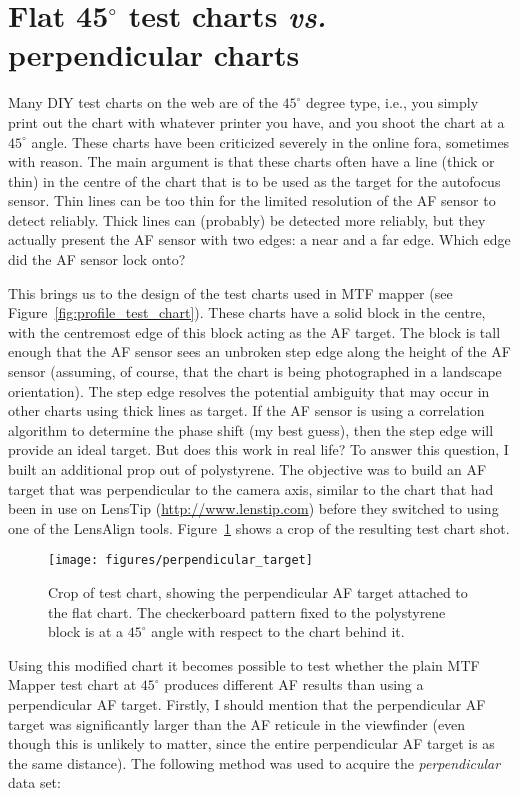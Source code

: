 \documentclass[a4paper]{article}
\begin{document}
\section{Flat 45$^\circ$ test charts \emph{vs.} perpendicular charts}
\label{sec:perpendicular}
Many DIY test charts on the web are of the $45^\circ$ degree type, i.e., you
simply print out the chart with whatever printer you have, and you shoot the
chart at a $45^\circ$ angle. These charts have been criticized severely in
the online fora, sometimes with reason. The main argument is that these
charts often have a line (thick or thin) in the centre of the chart that is
to be used as the target for the autofocus sensor. Thin lines can be too
thin for the limited resolution of the AF sensor to detect reliably. Thick
lines can (probably) be detected more reliably, but they actually present
the AF sensor with two edges: a near and a far edge. Which edge did the AF
sensor lock onto?

This brings us to the design of the test charts used in MTF mapper (see
Figure~\ref{fig:profile_test_chart}). These charts have a solid block in the
centre, with the centremost edge of this block acting as the AF target. The block is
tall enough that the AF sensor sees an unbroken step edge along the height
of the AF sensor (assuming, of course, that the chart is being photographed in a
landscape orientation). The step edge resolves the potential ambiguity that
may occur in other charts using thick lines as target. If the AF sensor is
using a correlation algorithm to determine the phase shift (my best
guess), then the step edge will provide an ideal target. But does this work
in real life? To answer this question, I built an additional prop out of
polystyrene. The objective was to build an AF target that was perpendicular
to the camera axis, similar to the chart that had been in use on LensTip
(\url{http://www.lenstip.com}) before they switched to using one of the
LensAlign tools. Figure~\ref{fig:perpendicular_target} shows a crop of the
resulting test chart shot.

\begin{figure}
  \centering
  \texttt{[image: figures/perpendicular\_target]}
  \caption{Crop of test chart, showing the perpendicular AF target attached
to the flat chart. The checkerboard pattern fixed to the polystyrene block
is at a $45^\circ$ angle with respect to the chart behind it.}
  \label{fig:perpendicular_target}
\end{figure}

Using this modified chart it becomes possible to test whether the plain MTF
Mapper test chart at $45^\circ$ produces different AF results than using a
perpendicular AF target. Firstly, I should mention that the perpendicular AF
target was significantly larger than the AF reticule in the viewfinder (even
though this is unlikely to matter, since the entire perpendicular AF target
is as the same distance). The following method was used to acquire the
\emph{perpendicular} data set:
\end{document}
